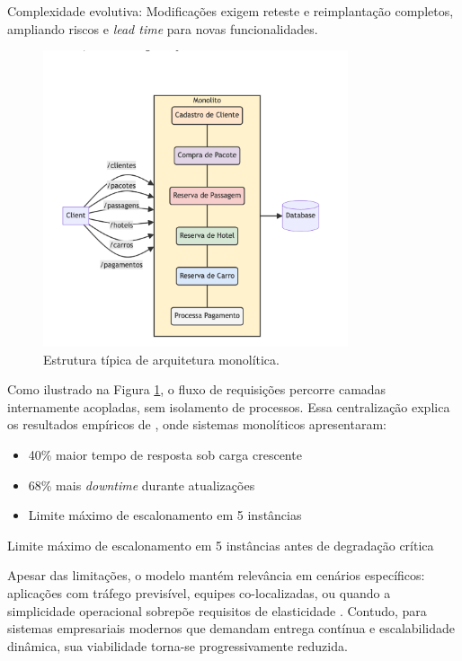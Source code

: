 Complexidade evolutiva: Modificações exigem reteste e reimplantação completos, ampliando riscos e \textit{lead time} para novas funcionalidades.

\begin{figure}[h]
\centering
\includegraphics[width=0.8\textwidth]{images/monolito.png}
\caption{Estrutura típica de arquitetura monolítica.}
\label{fig:monolitico}
\end{figure}

Como ilustrado na Figura \ref{fig:monolitico}, o fluxo de requisições percorre camadas internamente acopladas, sem isolamento de processos. Essa centralização explica os resultados empíricos de \cite{farhan2023performance}, onde sistemas monolíticos apresentaram:

\begin{itemize}
\item 40\% maior tempo de resposta sob carga crescente
\item 68\% mais \textit{downtime} durante atualizações
\item Limite máximo de escalonamento em 5 instâncias
\end{itemize}

Limite máximo de escalonamento em 5 instâncias antes de degradação crítica

Apesar das limitações, o modelo mantém relevância em cenários específicos: aplicações com tráfego previsível, equipes co-localizadas, ou quando a simplicidade operacional sobrepõe requisitos de elasticidade \cite{shekhar2023microservices}. Contudo, para sistemas empresariais modernos que demandam entrega contínua e escalabilidade dinâmica, sua viabilidade torna-se progressivamente reduzida.

